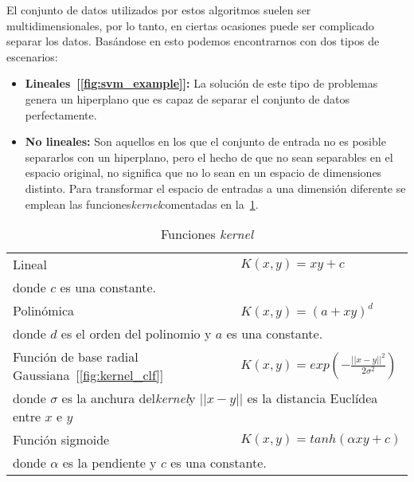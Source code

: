 El conjunto de datos utilizados por estos algoritmos suelen ser multidimensionales, por lo tanto, en ciertas ocasiones puede ser complicado separar los datos. Basándose en esto podemos encontrarnos con dos tipos de escenarios:

\begin{itemize}
    \item \textbf{Lineales~[\cref{fig:svm_example}]:} La solución de este tipo de problemas genera un hiperplano que es capaz de separar el conjunto de datos perfectamente.

    \item \textbf{No lineales:} Son aquellos en los que el conjunto de entrada no es posible separarlos con un hiperplano, pero el hecho de que no sean separables en el espacio original, no significa que no lo sean en un espacio de dimensiones distinto. Para transformar el espacio de entradas a una dimensión diferente se emplean las funciones\textit{kernel}comentadas en la~\cref{tab:kernel_functions}.
    
\end{itemize}



\begin{table}[htbp]
    \centering
    \begin{tabular}{l l}
        \toprule
        Lineal &  $ K(x,y) =  x y + c $  \\
        \multicolumn{2}{l}{\footnotesize donde $c$ es una constante.}\\  \midrule
        Polinómica       &  $K(x,y) = (a + xy)^d$ \\
        \multicolumn{2}{l}{\footnotesize donde $d$ es el orden del polinomio y $a$ es una constante.} \\ \midrule
        Función de base radial Gaussiana~[\cref{fig:kernel_clf}] & $K(x,y)=exp(- \frac{||x-y||^2}{2\sigma^2})$ \\
        \multicolumn{2}{l}{\footnotesize donde $\sigma$ es la anchura del\textit{kernel}y $||x-y||$ es la distancia Euclídea entre $x$ e $y$} \\
        \midrule
        Función sigmoide       & $ K(x,y)=tanh(\alpha x y+ c) $  \\
        \multicolumn{2}{l}{\footnotesize donde $\alpha$ es la pendiente y $c$ es una constante.} \\         
        \bottomrule
    \end{tabular}
    \caption{Funciones \textit{kernel}}
    \label{tab:kernel_functions}
\end{table}

